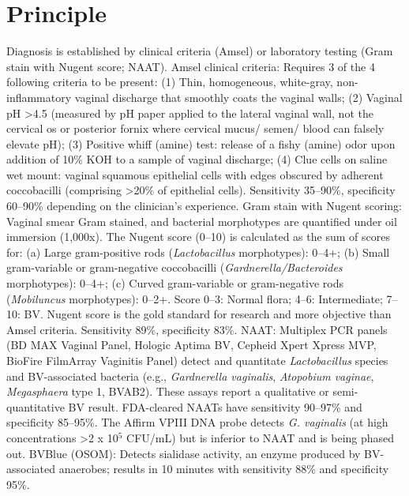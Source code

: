\section*{Principle}
Diagnosis is established by clinical criteria (Amsel) or laboratory testing (Gram stain with Nugent score; NAAT). Amsel clinical criteria: Requires 3 of the 4 following criteria to be present: (1) Thin, homogeneous, white-gray, non-inflammatory vaginal discharge that smoothly coats the vaginal walls; (2) Vaginal pH >4.5 (measured by pH paper applied to the lateral vaginal wall, not the cervical os or posterior fornix where cervical mucus/ semen/ blood can falsely elevate pH); (3) Positive whiff (amine) test: release of a fishy (amine) odor upon addition of 10\% KOH to a sample of vaginal discharge; (4) Clue cells on saline wet mount: vaginal squamous epithelial cells with edges obscured by adherent coccobacilli (comprising >20\% of epithelial cells). Sensitivity 35--90\%, specificity 60--90\% depending on the clinician's experience. Gram stain with Nugent scoring: Vaginal smear Gram stained, and bacterial morphotypes are quantified under oil immersion (1,000x). The Nugent score (0--10) is calculated as the sum of scores for: (a) Large gram-positive rods (\textit{Lactobacillus} morphotypes): 0--4+; (b) Small gram-variable or gram-negative coccobacilli (\textit{Gardnerella/Bacteroides} morphotypes): 0--4+; (c) Curved gram-variable or gram-negative rods (\textit{Mobiluncus} morphotypes): 0--2+. Score 0--3: Normal flora; 4--6: Intermediate; 7--10: BV. Nugent score is the gold standard for research and more objective than Amsel criteria. Sensitivity 89\%, specificity 83\%. NAAT: Multiplex PCR panels (BD MAX Vaginal Panel, Hologic Aptima BV, Cepheid Xpert Xpress MVP, BioFire FilmArray Vaginitis Panel) detect and quantitate \textit{Lactobacillus} species and BV-associated bacteria (e.g., \textit{Gardnerella vaginalis}, \textit{Atopobium vaginae}, \textit{Megasphaera} type 1, BVAB2). These assays report a qualitative or semi-quantitative BV result. FDA-cleared NAATs have sensitivity 90--97\% and specificity 85--95\%. The Affirm VPIII DNA probe detects \textit{G. vaginalis} (at high concentrations >2 x 10$^5$ CFU/mL) but is inferior to NAAT and is being phased out. BVBlue (OSOM): Detects sialidase activity, an enzyme produced by BV-associated anaerobes; results in 10 minutes with sensitivity 88\% and specificity 95\%.

